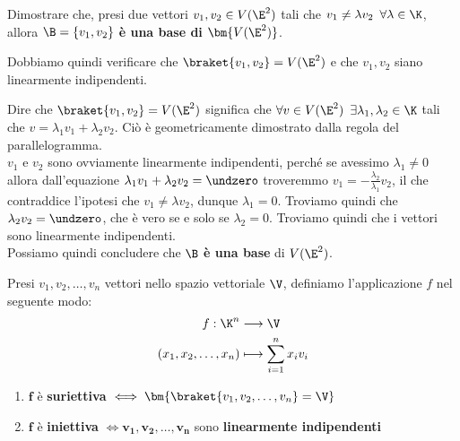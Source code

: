 \documentclass[11pt, a4paper, titlepage, oneside]{scrbook}
\begin{document}
\Esempio \nopagebreak

Dimostrare che, presi due vettori $v_1, v_2 \in V(\E^2)$ tali che $v_1 \neq \lambda v_2 \enspace \forall \lambda \in \K$, allora $\B = \{v_1, v_2\}$ \textbf{è una base di} $\bm{V(\E^2)}$. \nopagebreak

Dobbiamo quindi verificare che $\braket{v_1, v_2} = V(\E^2)$ e che $v_1, v_2$ siano linearmente indipendenti.

Dire che $\braket{v_1, v_2} = V(\E^2)$ significa che $\forall v \in V(\E^2) \enspace \exists \lambda_1, \lambda_2 \in \K$ tali che $v = \lambda_1 v_1 + \lambda_2 v_2$. Ciò è geometricamente dimostrato dalla regola del parallelogramma.\\
$v_1$ e $v_2$ sono ovviamente linearmente indipendenti, perché se avessimo $\lambda_1 \neq 0$ allora dall'equazione $\lambda_1 v_1 + \lambda_2 v_2 = \undzero$ troveremmo $v_1 = -\frac{\lambda_2}{\lambda_1} v_2$, il che contraddice l'ipotesi che $v_1 \neq \lambda v_2$, dunque $\lambda_1 = 0$. Troviamo quindi che $\lambda_2 v_2 = \undzero$, che è vero se e solo se $\lambda_2 = 0$. Troviamo quindi che i vettori sono linearmente indipendenti.\\
Possiamo quindi concludere che $\B$ \textbf{è una base} di $V(\E^2)$.

\begin{Proposizione}[]
\label{propos-base}

Presi $v_1, v_2, \ldots, v_n$ vettori nello spazio vettoriale $\V$, definiamo l'applicazione $f$ nel seguente modo:
\begin{align*}
f : \K^n &\longrightarrow \V \\
(x_1, x_2, \ldots, x_n) &\longmapsto \sum_{i = 1}^n x_i v_i 
\end{align*}

\begin{enumerate}[label=\alph*)]
    \item $\bm{f}$ è \textbf{suriettiva} $\iff \bm{\braket{v_1, v_2, \ldots, v_n} = \V}$
    \item $\bm{f}$ è \textbf{iniettiva} $\iff \bm{v_1, v_2, \ldots, v_n}$ sono \textbf{linearmente indipendenti}
\end{enumerate}

\end{Proposizione}

\Dimostrazione \nopagebreak
\end{document}
